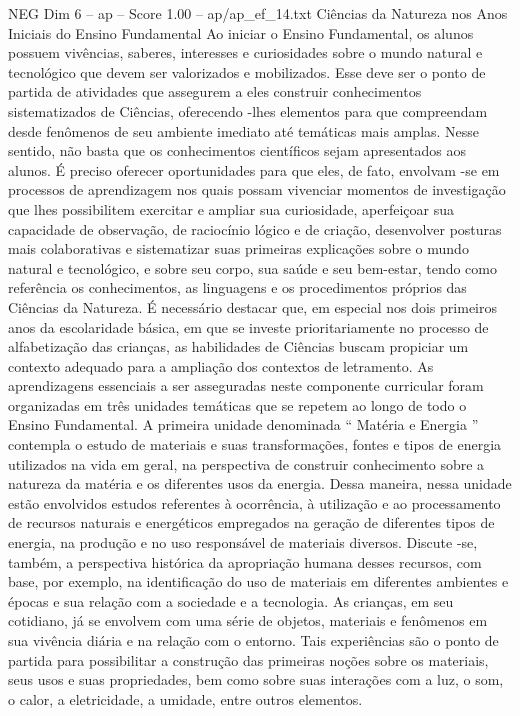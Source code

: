 \begin{textsample}{NEG Dim 6 – ap – Score 1.00 – ap/ap\_ef\_14.txt}  \label{ex:f6_neg_184}
Ciências da Natureza nos Anos Iniciais do Ensino Fundamental Ao iniciar o Ensino Fundamental, os alunos possuem vivências, saberes, interesses e curiosidades sobre o mundo natural e tecnológico que devem ser valorizados e mobilizados.
Esse deve ser o ponto de partida de atividades que assegurem a eles construir conhecimentos sistematizados de Ciências, oferecendo -lhes elementos para que compreendam desde fenômenos de seu ambiente imediato até temáticas mais amplas.
Nesse sentido, não basta que os conhecimentos científicos sejam apresentados aos alunos.
É preciso oferecer oportunidades para que eles, de fato, envolvam -se em processos de aprendizagem nos quais possam vivenciar momentos de investigação que lhes possibilitem exercitar e ampliar sua curiosidade, aperfeiçoar sua capacidade de observação, de raciocínio lógico e de criação, desenvolver posturas mais colaborativas e sistematizar suas primeiras explicações sobre o mundo natural e tecnológico, e sobre seu corpo, sua saúde e seu bem-estar, tendo como referência os conhecimentos, as linguagens e os procedimentos próprios das Ciências da Natureza.
É necessário destacar que, em especial nos dois primeiros anos da escolaridade básica, em que se investe prioritariamente no processo de alfabetização das crianças, as habilidades de Ciências buscam propiciar um contexto adequado para a ampliação dos contextos de letramento.
As aprendizagens essenciais a ser asseguradas neste componente curricular foram organizadas em três unidades temáticas que se repetem ao longo de todo o Ensino Fundamental.
A primeira unidade denominada “ Matéria e Energia ” contempla o estudo de materiais e suas transformações, fontes e tipos de energia utilizados na vida em geral, na perspectiva de construir conhecimento sobre a natureza da matéria e os diferentes usos da energia.
Dessa maneira, nessa unidade estão envolvidos estudos referentes à ocorrência, à utilização e ao processamento de recursos naturais e energéticos empregados na geração de diferentes tipos de energia, na produção e no uso responsável de materiais diversos.
Discute -se, também, a perspectiva histórica da apropriação humana desses recursos, com base, por exemplo, na identificação do uso de materiais em diferentes ambientes e épocas e sua relação com a sociedade e a tecnologia.
As crianças, em seu cotidiano, já se envolvem com uma série de objetos, materiais e fenômenos em sua vivência diária e na relação com o entorno.
Tais experiências são o ponto de partida para possibilitar a construção das primeiras noções sobre os materiais, seus usos e suas propriedades, bem como sobre suas interações com a luz, o som, o calor, a eletricidade, a umidade, entre outros elementos.

\end{textsample}
